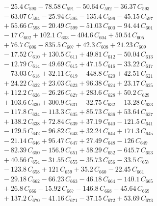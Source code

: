 \documentclass[a4paper,11pt]{article}
\begin{document}
\begin{align}
&\quad - 25.4\,C_{590} - 78.58\,C_{591} - 50.64\,C_{592} - 36.37\,C_{593} \nonumber\\
&\quad - 63.07\,C_{594} - 25.94\,C_{595} - 135.4\,C_{596} - 45.15\,C_{597} \nonumber\\
&\quad + 55.66\,C_{598} - 20.49\,C_{599} - 51.03\,C_{600} - 94.44\,C_{601} \nonumber\\
&\quad - 17\,C_{602} + 102.1\,C_{603} - 404.6\,C_{604} + 50.54\,C_{605} \nonumber\\
&\quad + 76.7\,C_{606} - 835.5\,C_{607} + 42.3\,C_{608} + 21.23\,C_{609} \nonumber\\
&\quad - 17.52\,C_{610} + 130.5\,C_{611} + 49.81\,C_{612} - 50.04\,C_{613} \nonumber\\
&\quad - 12.79\,C_{614} - 49.69\,C_{615} + 47.15\,C_{616} - 33.22\,C_{617} \nonumber\\
&\quad - 73.03\,C_{618} + 32.11\,C_{619} - 448.8\,C_{620} + 42.51\,C_{621} \nonumber\\
&\quad + 24.22\,C_{622} + 23.03\,C_{623} + 96.38\,C_{624} + 23.17\,C_{625} \nonumber\\
&\quad + 112.2\,C_{626} - 26.26\,C_{627} + 283.6\,C_{628} + 50.2\,C_{629} \nonumber\\
&\quad + 103.6\,C_{630} + 300.9\,C_{631} - 32.75\,C_{632} - 13.28\,C_{633} \nonumber\\
&\quad - 117.8\,C_{634} - 113.3\,C_{635} + 85.73\,C_{636} + 53.64\,C_{637} \nonumber\\
&\quad + 138.2\,C_{638} + 72.84\,C_{639} + 37.19\,C_{640} - 121.5\,C_{641} \nonumber\\
&\quad - 129.5\,C_{642} - 96.82\,C_{643} + 32.24\,C_{644} + 171.3\,C_{645} \nonumber\\
&\quad - 21.14\,C_{646} + 95.47\,C_{647} + 27.49\,C_{648} - 126\,C_{649} \nonumber\\
&\quad - 82.39\,C_{650} - 156.9\,C_{651} + 58.29\,C_{652} - 645.7\,C_{653} \nonumber\\
&\quad + 40.56\,C_{654} - 31.55\,C_{655} - 35.73\,C_{656} - 33.5\,C_{657} \nonumber\\
&\quad - 123.8\,C_{658} + 121\,C_{659} + 35.2\,C_{660} - 22.45\,C_{661} \nonumber\\
&\quad - 29.18\,C_{662} - 66.23\,C_{663} - 46.18\,C_{664} - 140.1\,C_{665} \nonumber\\
&\quad + 26.8\,C_{666} - 15.92\,C_{667} - 146.8\,C_{668} - 45.64\,C_{669} \nonumber\\
&\quad + 137.2\,C_{670} - 41.16\,C_{671} - 37.15\,C_{672} + 53.69\,C_{673} \nonumber\\

\end{align}
\end{document}
